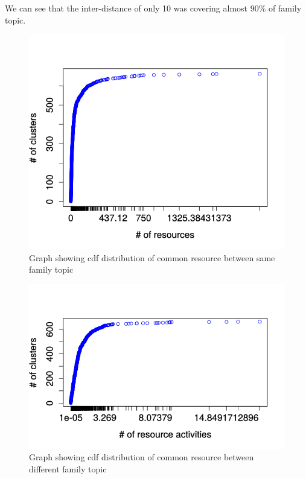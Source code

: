 We can see that the inter-distance of only 10 was covering almost $90\%$ of family topic.
\begin{figure}[htbp]
\begin{center}
  \includegraphics[scale=0.7]{figures/intra_clustered_common.png}
\end{center}
\captionsetup{font=small}
\caption{ Graph showing cdf distribution of common resource between same family topic}
\label{fig:intraclustcommon}
\end{figure}
\begin{figure}[htbp]
\begin{center}
  \includegraphics[scale=0.7]{figures/inter_clustered_common.png}
\end{center}
\captionsetup{font=small}
\caption{Graph showing cdf distribution of common resource between different family topic}
\label{fig:interclustcommon}
\end{figure}

